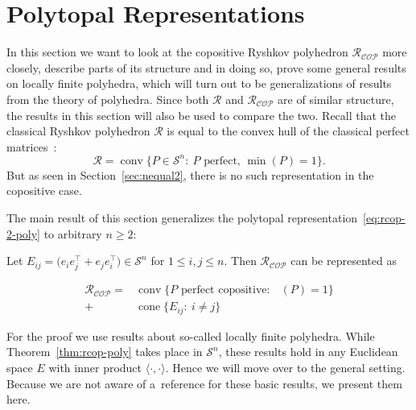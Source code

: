 \documentclass{commat}
\newcommand{\sR}{\mathcal{R}}
\DeclareMathOperator{\cone}{cone}
\DeclareMathOperator{\conv}{conv}
\newcommand{\sn}{{\mathcal{S}}^{n}}
\newcommand{\cop}{{\mathcal{COP}}}
\DeclareMathOperator{\minC}{min_{\cop}}
\begin{document}
\section{Polytopal Representations}\label{sec:polyrepr}
In this section we want to look at the copositive Ryshkov polyhedron \(\sR_\cop \) more closely,
describe parts of its structure and in doing so, prove some general results on locally finite polyhedra,
which will turn out to be generalizations of results from the theory of polyhedra.
Since both \(\sR \) and \(\sR_\cop \) are of similar structure, the results in this section
will also be used to compare the two.
Recall that the classical Ryshkov polyhedron \(\sR \) is equal to the convex hull of the classical
perfect matrices~\cite[Chapter 3.1]{schuermann-2009}:
\[
	\sR = \conv\big\{ P\in\sn :\ P \text{ perfect, } \min(P)=1 \big\}.
\]
But as seen in Section~\ref{sec:nequal2}, there is no such representation in the copositive case.

The main result of this section generalizes the polytopal representation~\eqref{eq:rcop-2-poly}
to arbitrary \(n \geq 2 \):
\begin{theorem}\label{thm:rcop-poly}
	Let \(E_{ij}=\big(e_ie_j^\intercal + e_je_i^\intercal\big)\in\sn \) for
	\(1 \leq i,j \leq n \).
	Then \(\sR_\cop \) can be represented as
	
\begin{align*}
		\sR_\cop =& \conv\big\{ P \text{ perfect copositive}: \ \minC(P)=1 \big\} \\
			 	 +& \cone\big\{ E_{ij} : \ i \neq j \big\} \nonumber
\end{align*}
\end{theorem}
For the proof we use results about so-called locally finite polyhedra.
While Theorem~\ref{thm:rcop-poly} takes place in \(\sn \), these results hold in any
Euclidean space $E$ with inner product \(\langle \cdot,\cdot \rangle \).
Hence we will move over to the general setting.
Because we are not aware of a~reference for these basic results, we present them here.
\end{document}
